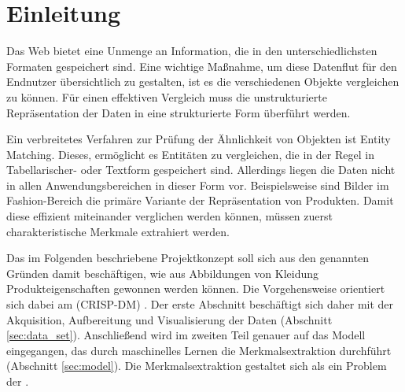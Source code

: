 \section{Einleitung} \label{sec:intro}

Das Web bietet eine Unmenge an Information, die in den unterschiedlichsten Formaten gespeichert sind. Eine wichtige Maßnahme, um diese Datenflut für den Endnutzer übersichtlich zu gestalten, ist es die verschiedenen Objekte vergleichen zu können. Für einen effektiven Vergleich muss die unstrukturierte Repräsentation der Daten in eine strukturierte Form überführt werden.

Ein verbreitetes Verfahren zur Prüfung der Ähnlichkeit von Objekten ist Entity Matching. Dieses, ermöglicht es Entitäten zu vergleichen, die in der Regel in Tabellarischer- oder Textform gespeichert sind. Allerdings liegen die Daten nicht in allen Anwendungsbereichen in dieser Form vor. Beispielsweise sind Bilder im Fashion-Bereich die primäre Variante der Repräsentation von Produkten. Damit diese effizient miteinander verglichen werden können, müssen zuerst charakteristische Merkmale extrahiert werden.

Das im Folgenden beschriebene Projektkonzept soll sich aus den genannten Gründen damit beschäftigen, wie aus Abbildungen von Kleidung Produkteigenschaften gewonnen werden können. Die Vorgehensweise orientiert sich dabei am  (CRISP-DM) \cite{Shearer2000}. Der erste Abschnitt beschäftigt sich daher mit der Akquisition, Aufbereitung und Visualisierung der Daten (Abschnitt \ref{sec:data_set}). Anschließend wird im zweiten Teil genauer auf das Modell eingegangen, das durch maschinelles Lernen die Merkmalsextraktion durchführt (Abschnitt \ref{sec:model}). Die Merkmalsextraktion gestaltet sich als ein Problem der  \cite{scikit-learn}.